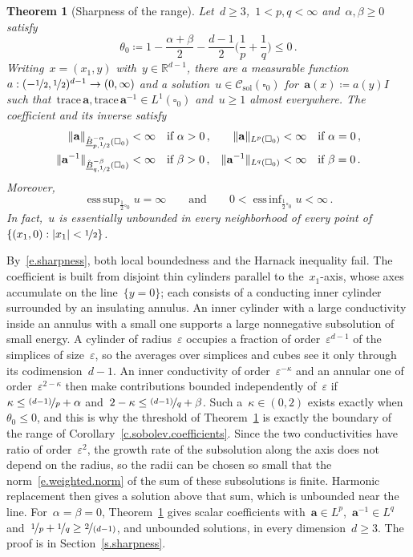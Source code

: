 \documentclass[11pt,letterpaper]{article}
\numberwithin{equation}{section}
\newtheorem{theoremA}{Theorem}
\theoremstyle{definition}
\newcommand{\R}{\mathbb{R}}
\renewcommand{\a}{\mathbf{a}}
\newcommand{\eps}{\varepsilon}
\newcommand{\nf}{\nicefrac}
\newcommand{\cu}{\square}
\newcommand*{\tr}{\mathrm{trace\,}}
\DeclareMathOperator*{\esssup}{ess\,sup}
\DeclareMathOperator*{\essinf}{ess\,inf}
\DeclarePairedDelimiter{\norm}{\lVert}{\rVert}
\newcommand{\Csol}{\mathcal C_{\mathrm{sol}}}
\begin{document}
\begin{theoremA}[Sharpness of the range]
\label{t.sharpness}
Let~$d\geq3$,~$1<p,q<\infty$ and~$\alpha,\beta\geq0$ satisfy
\begin{equation*}
	\theta_0\coloneqq1-\frac{\alpha+\beta}2-\frac{d-1}{2}\biggl(\frac1p+\frac1q\biggr)\leq0\,.
\end{equation*}
Writing~$x=(x_1,y)$ with~$y\in\R^{d-1}$, there are a measurable function~$a:(-\nf12,\nf12)^{d-1}\to(0,\infty)$ and a solution~$u\in\Csol(\cu_0)$ for~$\a(x)\coloneqq a(y)I$ such that~$\tr\a,\tr\a^{-1}\in L^1(\cu_0)$ and~$u\geq1$ almost everywhere. The coefficient and its inverse satisfy
\begin{equation*}
\begin{aligned}
	\norm{\a}_{\mathring{\underline B}^{-\alpha}_{p,\nf12}(\cu_0)}&<\infty\quad\text{if }\alpha>0\,, & \norm{\a}_{L^p(\cu_0)}&<\infty\quad\text{if }\alpha=0\,,\\
	\norm{\a^{-1}}_{\mathring{\underline B}^{-\beta}_{q,\nf12}(\cu_0)}&<\infty\quad\text{if }\beta>0\,, & \norm{\a^{-1}}_{L^q(\cu_0)}&<\infty\quad\text{if }\beta=0\,.
\end{aligned}
\end{equation*}
Moreover,
\begin{equation}
	\esssup_{\frac12\cu_0}u=\infty\qquad\mbox{and}\qquad 0<\essinf_{\frac12\cu_0}u<\infty\,.
	\label{e.sharpness}
\end{equation}
In fact,~$u$ is essentially unbounded in every neighborhood of every point of~$\{(x_1,0):|x_1|<\nf12\}$.
\end{theoremA}

By~\eqref{e.sharpness}, both local boundedness and the Harnack inequality fail. The coefficient is built from disjoint thin cylinders parallel to the~$x_1$-axis, whose axes accumulate on the line~$\{y=0\}$; each consists of a conducting inner cylinder surrounded by an insulating annulus. An inner cylinder with a large conductivity inside an annulus with a small one supports a large nonnegative subsolution of small energy. A cylinder of radius~$\eps$ occupies a fraction of order~$\eps^{d-1}$ of the simplices of size~$\eps$, so the averages over simplices and cubes see it only through its codimension~$d-1$. An inner conductivity of order~$\eps^{-\kappa}$ and an annular one of order~$\eps^{2-\kappa}$ then make contributions bounded independently of~$\eps$ if~$\kappa\leq\nf{(d-1)}p+\alpha$ and~$2-\kappa\leq\nf{(d-1)}q+\beta$. Such a~$\kappa\in(0,2)$ exists exactly when~$\theta_0\leq0$, and this is why the threshold of Theorem~\ref{t.sharpness} is exactly the boundary of the range of Corollary~\ref{c.sobolev.coefficients}. Since the two conductivities have ratio of order~$\eps^2$, the growth rate of the subsolution along the axis does not depend on the radius, so the radii can be chosen so small that the norm~\eqref{e.weighted.norm} of the sum of these subsolutions is finite. Harmonic replacement then gives a solution above that sum, which is unbounded near the line. For~$\alpha=\beta=0$, Theorem~\ref{t.sharpness} gives scalar coefficients with~$\a\in L^p$,~$\a^{-1}\in L^q$ and~$\nf1p+\nf1q\geq\nf2{(d-1)}$, and unbounded solutions, in every dimension~$d\geq3$. The proof is in Section~\ref{s.sharpness}.
\end{document}
